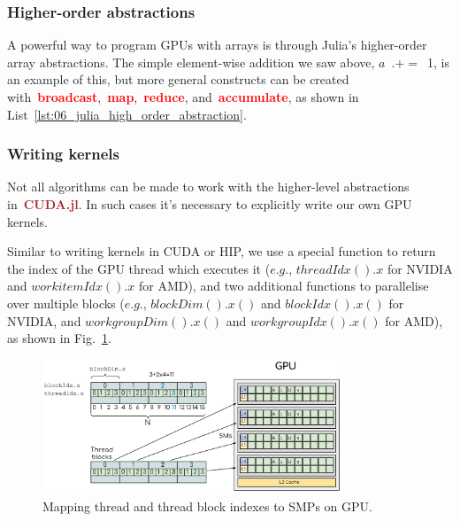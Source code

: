\subsubsection{Higher-order abstractions}


\par
A powerful way to program GPUs with arrays is through Julia’s higher-order array abstractions.
The simple element-wise addition we saw above, $a$~$.+=$~1, is an example of this, but more general constructs can be created with~\textbf{\textcolor{red}{broadcast}},~\textbf{\textcolor{red}{map}},~\textbf{\textcolor{red}{reduce}}, and~\textbf{\textcolor{red}{accumulate}}, as shown in List~\ref{lst:06_julia_high_order_abstraction}.





\subsubsection{Writing kernels}


\par
Not all algorithms can be made to work with the higher-level abstractions in~\textbf{\textcolor{brown}{CUDA.jl}}.
In such cases it’s necessary to explicitly write our own GPU kernels.


\par
Similar to writing kernels in CUDA or HIP, we use a special function to return the index of the GPU thread which executes it ($e.g.$, $threadIdx().x$ for NVIDIA and $workitemIdx().x$ for AMD), and two additional functions to parallelise over multiple blocks ($e.g.$, $blockDim().x()$ and $blockIdx().x()$ for NVIDIA, and $workgroupDim().x()$ and $workgroupIdx().x()$ for AMD), as shown in Fig.~\ref{fig:mapping_blocks_2_SMs}.


\begin{figure}[!h]
\centering\includegraphics[width=0.8\textwidth]{fig_hardware/mapping_blocks_2_SMs.png}
\caption{Mapping thread and thread block indexes to SMPs on GPU.}\label{fig:mapping_blocks_2_SMs}
\end{figure}


